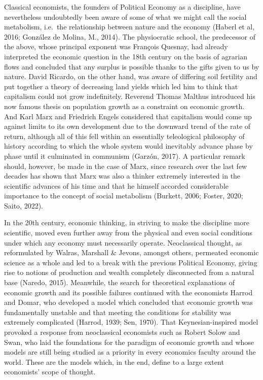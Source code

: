 \documentclass[
]{book}
\begin{document}
Classical economists, the founders of Political Economy as a discipline, have nevertheless undoubtedly been aware of some of what we might call the social metabolism, i.e.~the relationship between nature and the economy (Haberl et al, 2016; González de Molina, M., 2014). The physiocratic school, the predecessor of the above, whose principal exponent was François Quesnay, had already interpreted the economic question in the 18th century on the basis of agrarian flows and concluded that any surplus is possible thanks to the gifts given to us by nature. David Ricardo, on the other hand, was aware of differing soil fertility and put together a theory of decreasing land yields which led him to think that capitalism could not grow indefinitely. Reverend Thomas Malthus introduced his now famous thesis on population growth as a constraint on economic growth. And Karl Marx and Friedrich Engels considered that capitalism would come up against limits to its own development due to the downward trend of the rate of return, although all of this fell within an essentially teleological philosophy of history according to which the whole system would inevitably advance phase by phase until it culminated in communism (Garzón, 2017). A particular remark should, however, be made in the case of Marx, since research over the last few decades has shown that Marx was also a thinker extremely interested in the scientific advances of his time and that he himself accorded considerable importance to the concept of social metabolism (Burkett, 2006; Foster, 2020; Saito, 2022).

In the 20th century, economic thinking, in striving to make the discipline more scientific, moved even further away from the physical and even social conditions under which any economy must necessarily operate. Neoclassical thought, as reformulated by Walras, Marshall \& Jevons, amongst others, permeated economic science as a whole and led to a break with the previous Political Economy, giving rise to notions of production and wealth completely disconnected from a natural base (Naredo, 2015). Meanwhile, the search for theoretical explanations of economic growth and its possible failures continued with the economists Harrod and Domar, who developed a model which concluded that economic growth was fundamentally unstable and that meeting the conditions for stability was extremely complicated (Harrod, 1939; Sen, 1970). That Keynesian-inspired model provoked a response from neoclassical economists such as Robert Solow and Swan, who laid the foundations for the paradigm of economic growth and whose models are still being studied as a priority in every economics faculty around the world. These are the models which, in the end, define to a large extent economists' scope of thought.
\end{document}
